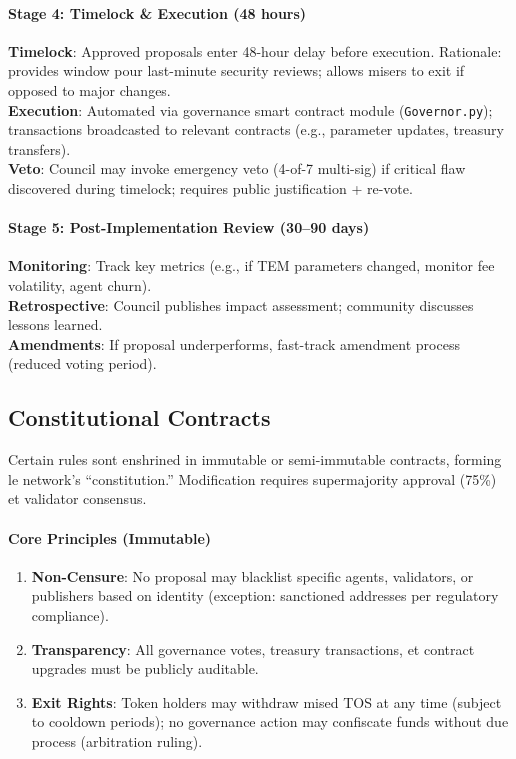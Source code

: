 \documentclass[11pt]{article}
\begin{document}
\paragraph{Stage 4: Timelock \& Execution (48 hours)}
\textbf{Timelock}: Approved proposals enter 48-hour delay before execution. Rationale: provides window pour last-minute security reviews; allows misers to exit if opposed to major changes.\\
\textbf{Execution}: Automated via governance smart contract module (\texttt{Governor.py}); transactions broadcasted to relevant contracts (e.g., parameter updates, treasury transfers).\\
\textbf{Veto}: Council may invoke emergency veto (4-of-7 multi-sig) if critical flaw discovered during timelock; requires public justification + re-vote.

\paragraph{Stage 5: Post-Implementation Review (30--90 days)}
\textbf{Monitoring}: Track key metrics (e.g., if TEM parameters changed, monitor fee volatility, agent churn).\\
\textbf{Retrospective}: Council publishes impact assessment; community discusses lessons learned.\\
\textbf{Amendments}: If proposal underperforms, fast-track amendment process (reduced voting period).

\subsection{Constitutional Contracts}

Certain rules sont enshrined in immutable or semi-immutable contracts, forming le network's ``constitution.'' Modification requires supermajority approval (75\%) et validator consensus.

\paragraph{Core Principles (Immutable)}
\begin{enumerate}[noitemsep]
  \item \textbf{Non-Censure}: No proposal may blacklist specific agents, validators, or publishers based on identity (exception: sanctioned addresses per regulatory compliance).
  \item \textbf{Transparency}: All governance votes, treasury transactions, et contract upgrades must be publicly auditable.
  \item \textbf{Exit Rights}: Token holders may withdraw mised TOS at any time (subject to cooldown periods); no governance action may confiscate funds without due process (arbitration ruling).
\end{enumerate}
\end{document}
